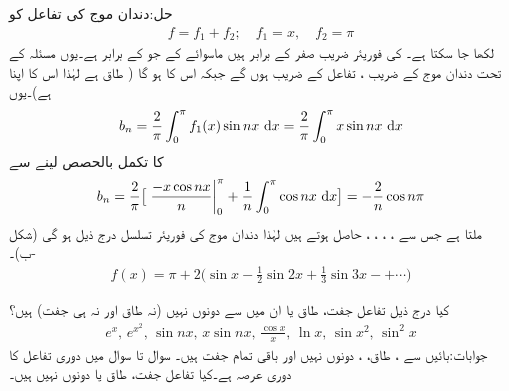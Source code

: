 حل:دندان موج کی تفاعل کو
\begin{align*}
f=f_1+f_2;\quad f_1=x,\quad f_2=\pi
\end{align*}
لکھا جا سکتا ہے۔ کی فوریئر  ضریب  صفر کے برابر ہیں ماسوائے  کے جو  کے برابر ہے۔یوں مسئلہ  کے تحت دندان موج کے  ضریب  ،  تفاعل  کے  ضریب  ہوں گے جبکہ اس کا  ہو گا ( طاق ہے لہٰذا اس کا اپنا  ہے)۔یوں
\begin{align*}
b_n=\frac{2}{\pi}\int_0^{\pi} f_1(x)\sin nx\,\dif x=\frac{2}{\pi}\int_0^{\pi} x\sin nx\,\dif x
\end{align*}
کا تکمل بالحصص لینے سے
\begin{align*}
b_n=\frac{2}{\pi}\big[\left. \frac{-x\cos nx}{n}\right|_0^{\pi}+\frac{1}{n}\int_0^{\pi} \cos nx\,\dif x\big]=-\frac{2}{n}\cos n\pi
\end{align*}
ملتا ہے جس سے ، ، ، ،  حاصل ہوتے ہیں لہٰذا دندان موج کی فوریئر تسلسل درج ذیل ہو گی (شکل -ب)۔
\begin{align*}
f(x)=\pi+2\big(\sin x-\frac{1}{2}\sin 2x+\frac{1}{3}\sin 3x-+\cdots\big)
\end{align*}



\quad کیا درج ذیل تفاعل جفت، طاق یا ان میں سے دونوں نہیں (نہ طاق اور نہ ہی جفت) ہیں؟\\
\begin{align*}
e^x,\, e^{x^2},\, \sin nx,\,x\sin nx,\, \frac{\cos x}{x},\, \ln x,\, \sin x^2,\, \sin^2 x
\end{align*}
جوابات:بائیں سے  ،  طاق، ،  دونوں نہیں اور باقی تمام جفت ہیں۔
سوال  تا سوال  میں دوری تفاعل  کا دوری عرصہ  ہے۔کیا تفاعل جفت، طاق یا دونوں نہیں ہیں۔

